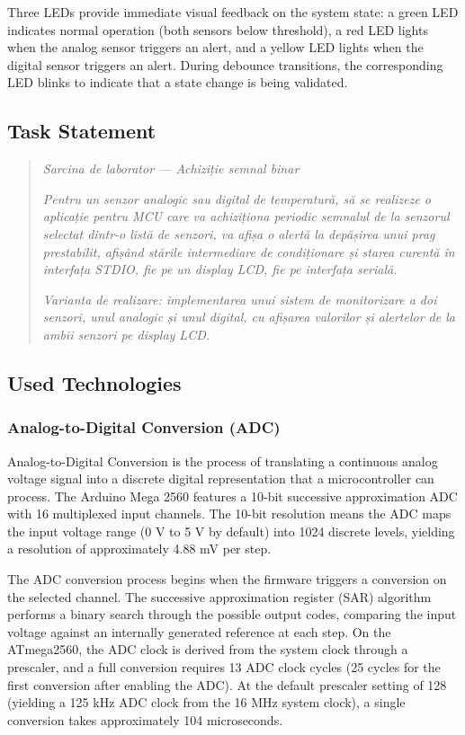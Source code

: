 Three LEDs provide immediate visual feedback on the system state: a green LED indicates normal operation (both sensors below threshold), a red LED lights when the analog sensor triggers an alert, and a yellow LED lights when the digital sensor triggers an alert. During debounce transitions, the corresponding LED blinks to indicate that a state change is being validated.

\subsection{Task Statement}

\begin{quote}
\textit{Sarcina de laborator --- Achiziție semnal binar}

\textit{Pentru un senzor analogic sau digital de temperatură, să se realizeze o aplicație pentru MCU care va achiziționa periodic semnalul de la senzorul selectat dintr-o listă de senzori, va afișa o alertă la depășirea unui prag prestabilit, afișând stările intermediare de condiționare și starea curentă în interfața STDIO, fie pe un display LCD, fie pe interfața serială.}

\textit{Varianta de realizare: implementarea unui sistem de monitorizare a doi senzori, unul analogic și unul digital, cu afișarea valorilor și alertelor de la ambii senzori pe display LCD.}
\end{quote}

\subsection{Used Technologies}

\subsubsection{Analog-to-Digital Conversion (ADC)}

Analog-to-Digital Conversion is the process of translating a continuous analog voltage signal into a discrete digital representation that a microcontroller can process. The Arduino Mega 2560 features a 10-bit successive approximation ADC with 16 multiplexed input channels. The 10-bit resolution means the ADC maps the input voltage range (0 V to 5 V by default) into 1024 discrete levels, yielding a resolution of approximately 4.88 mV per step.

The ADC conversion process begins when the firmware triggers a conversion on the selected channel. The successive approximation register (SAR) algorithm performs a binary search through the possible output codes, comparing the input voltage against an internally generated reference at each step. On the ATmega2560, the ADC clock is derived from the system clock through a prescaler, and a full conversion requires 13 ADC clock cycles (25 cycles for the first conversion after enabling the ADC). At the default prescaler setting of 128 (yielding a 125 kHz ADC clock from the 16 MHz system clock), a single conversion takes approximately 104 microseconds.

